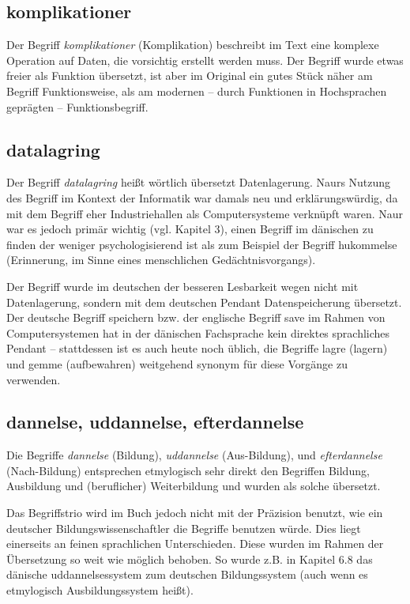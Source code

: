 \subsection{komplikationer}
    Der Begriff \emph{komplikationer} (Komplikation) beschreibt im Text eine komplexe Operation auf Daten, die vorsichtig erstellt werden muss. Der Begriff wurde etwas freier als Funktion übersetzt, ist aber im Original ein gutes Stück näher am Begriff Funktionsweise, als am modernen -- durch Funktionen in Hochsprachen geprägten -- Funktionsbegriff.

\subsection{datalagring}  

    Der Begriff \emph{datalagring} heißt wörtlich übersetzt Datenlagerung. Naurs Nutzung des Begriff im Kontext der Informatik war damals neu und erklärungswürdig, da mit dem Begriff eher Industriehallen als Computersysteme verknüpft waren. Naur war es jedoch primär wichtig (vgl. Kapitel 3), einen Begriff im dänischen zu finden der weniger psychologisierend ist als zum Beispiel der Begriff hukommelse (Erinnerung, im Sinne eines menschlichen Gedächtnisvorgangs). 
    
    Der Begriff wurde im deutschen der besseren Lesbarkeit wegen nicht mit Datenlagerung, sondern mit dem deutschen Pendant Datenspeicherung übersetzt. Der deutsche Begriff speichern bzw. der englische Begriff save im Rahmen von Computersystemen hat in der dänischen Fachsprache kein direktes sprachliches Pendant -- stattdessen ist es auch heute noch üblich, die Begriffe lagre (lagern) und gemme (aufbewahren) weitgehend synonym für diese Vorgänge zu verwenden.


    
\subsection{dannelse, uddannelse, efterdannelse}

    Die Begriffe \emph{dannelse} (Bildung), \emph{uddannelse} (Aus-Bildung), und \emph{efterdannelse} (Nach-Bildung) entsprechen etmylogisch sehr direkt den Begriffen Bildung, Ausbildung und (beruflicher) Weiterbildung und wurden als solche übersetzt.

    Das Begriffstrio wird im Buch jedoch nicht mit der Präzision benutzt, wie ein deutscher Bildungswissenschaftler die Begriffe benutzen würde. Dies liegt einerseits an feinen sprachlichen Unterschieden. Diese wurden im Rahmen der Übersetzung so weit wie möglich behoben. So wurde z.B. in Kapitel 6.8 das dänische uddannelsessystem zum deutschen Bildungssystem (auch wenn es etmylogisch Ausbildungssystem heißt).
    
